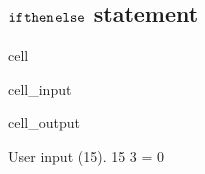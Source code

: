 \documentclass[letterpaper,10pt,english]{jupyterBook}
\begin{document}
\subsection{\protect\(\texttt{if}\protect\)\sphinxhyphen{}\protect\(\texttt{then}\protect\)\sphinxhyphen{}\protect\(\texttt{else}\protect\) statement}
\label{\detokenize{ch/programming/flow_control:texttt-if-texttt-then-texttt-else-statement}}
\begin{sphinxuseclass}{cell}\begin{sphinxVerbatimInput}

\begin{sphinxuseclass}{cell_input}
\begin{sphinxVerbatim}[commandchars=\\\{\}]

  

            
      
          
      
                  
      
    
\end{sphinxVerbatim}

\end{sphinxuseclass}\end{sphinxVerbatimInput}
\begin{sphinxVerbatimOutput}

\begin{sphinxuseclass}{cell_output}
\begin{sphinxVerbatim}[commandchars=\\\{\}]
User input (15). 15 \PYGZpc{} 3 = 0
\end{sphinxVerbatim}

\end{sphinxuseclass}\end{sphinxVerbatimOutput}

\end{sphinxuseclass}
\end{document}
